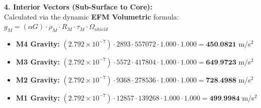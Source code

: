 \documentclass[11pt, a4paper]{article}
\begin{document}
  \vspace{0.5em}
  \noindent \textbf{4. Interior Vectors (Sub-Surface to Core):} \\[0.5em]
  \hspace*{1em} Calculated via the dynamic \textbf{EFM Volumetric} formula: $g_M = (\alpha G) \cdot \rho_{M} \cdot R_M \cdot \tau_M \cdot \Omega_{shield}$
  \begin{itemize}
    \item \textbf{M4 Gravity:} $(2.792 \times 10^{-7}) \cdot 2893 \cdot 557072 \cdot 1.000 \cdot 1.000 = \textbf{450.0821}$ m/s$^2$
    \item \textbf{M3 Gravity:} $(2.792 \times 10^{-7}) \cdot 5572 \cdot 417804 \cdot 1.000 \cdot 1.000 = \textbf{649.9723}$ m/s$^2$
    \item \textbf{M2 Gravity:} $(2.792 \times 10^{-7}) \cdot 9368 \cdot 278536 \cdot 1.000 \cdot 1.000 = \textbf{728.4988}$ m/s$^2$
    \item \textbf{M1 Gravity:} $(2.792 \times 10^{-7}) \cdot 12857 \cdot 139268 \cdot 1.000 \cdot 1.000 = \textbf{499.9984}$ m/s$^2$
  \end{itemize}
\end{document}
